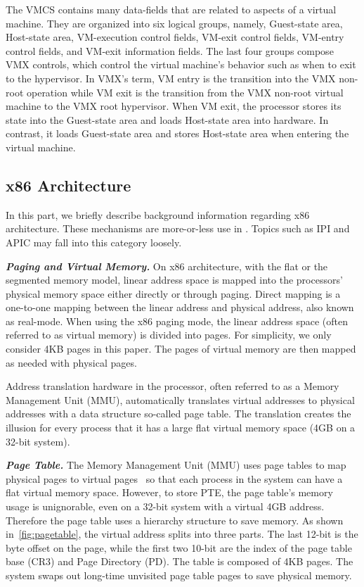 The VMCS contains many data-fields that are related to aspects of a virtual machine. They are organized into six logical groups, namely, Guest-state area, Host-state area, VM-execution control fields, VM-exit control fields, VM-entry control fields, and VM-exit information fields. The last four groups compose VMX controls, which control the virtual machine's behavior such as when to exit to the hypervisor. In VMX's term, VM entry is the transition into the VMX non-root operation while VM exit is the transition from the VMX non-root virtual machine to the VMX root  hypervisor. When VM exit, the processor stores its state into the Guest-state area and loads Host-state area into hardware. In contrast, it loads Guest-state area and stores Host-state area when entering the virtual machine.

\subsection{x86 Architecture}

In this part, we briefly describe background information regarding x86 architecture. These mechanisms are more-or-less use in \name. Topics such as IPI and APIC may fall into this category loosely.

\textbf{\textit{Paging and Virtual Memory.}} On x86 architecture, with the flat or the segmented memory model, linear address space is mapped into the processors' physical memory space either directly or through paging.  Direct mapping is a one-to-one mapping between the linear address and physical address, also known as real-mode. When using the x86 paging mode, the linear address space (often referred to as virtual memory) is divided into pages. For simplicity, we only consider 4KB pages in this paper. The pages of virtual memory are then mapped as needed with physical pages.

Address translation hardware in the processor, often referred to as a Memory Management Unit (MMU), automatically translates virtual addresses to physical addresses with a data structure so-called page table. The translation creates the illusion for every process that it has a large flat virtual memory space (4GB on a 32-bit system).



\textbf{\textit{Page Table.}} The Memory Management Unit (MMU) uses page tables to map physical pages to virtual pages~\cite{intelpaging} so that each process in the system can have a flat virtual memory space. However, to store PTE, the page table's memory usage is unignorable, even on a 32-bit system with a virtual 4GB address. Therefore the page table uses a hierarchy structure to save memory. As shown in~\autoref{fig:pagetable}, the virtual address splits into three parts. The last 12-bit is the byte offset on the page, while the first two 10-bit are the index of the page table base (CR3) and Page Directory (PD). The table is composed of 4KB pages.  The system swaps out long-time unvisited page table pages to save physical memory. 

